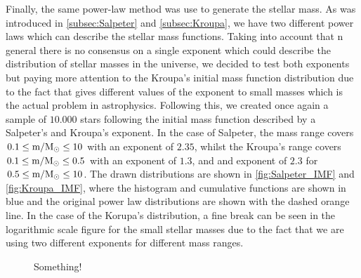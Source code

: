 Finally, the same power-law method was use to generate the stellar mass. As was introduced in \autoref{subsec:Salpeter} and \autoref{subsec:Kroupa}, we have two different power laws which can describe the stellar mass functions. Taking into account that n general there is no consensus on a single exponent which could describe the distribution of stellar masses in the universe, we decided to test both exponents but paying more attention to the Kroupa's initial mass function distribution due to the fact that gives different values of the exponent to small masses which is the actual problem in astrophysics. Following this, we created once again a sample of $10.000$ stars following the initial mass function described by a Salpeter's and Kroupa's exponent. In the case of Salpeter, the mass range covers  $0.1 \leq \textnormal{m/M$_\odot$} \leq 10$ with an exponent of $2.35$, whilst the Kroupa's range covers $0.1 \leq \textnormal{m/M$_\odot$} \leq 0.5$ with an exponent of $1.3$, and and exponent of $2.3$ for $0.5 \leq \textnormal{m/M$_\odot$} \leq 10$. The drawn distributions are shown in \autoref{fig:Salpeter_IMF} and \autoref{fig:Kroupa_IMF}, where the histogram and cumulative functions are shown in blue and the original power law distributions are shown with the dashed orange line. In the case of the Korupa's distribution, a fine break can be seen in the logarithmic scale figure for the small stellar masses due to the fact that we are using two different exponents for different mass ranges.\\  

\begin{figure}[!ht]
\centering
\caption{\scriptsize{Something!}}
\label{fig:Salpeter_IMF}
\end{figure}

